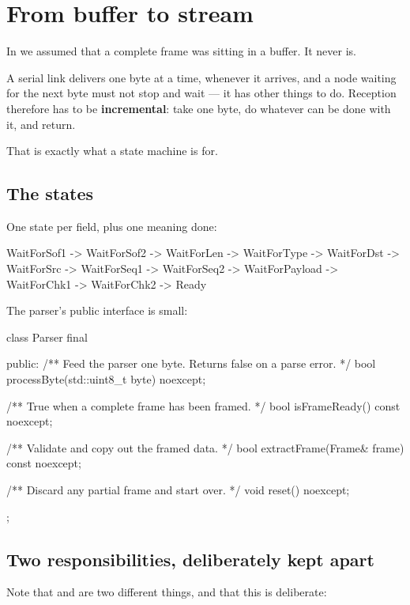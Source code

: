 \section{From buffer to stream}
\label{sec:frombuffer}

In  we assumed that a complete frame was sitting in a buffer. It never is.

A serial link delivers one byte at a time, whenever it arrives, and a node waiting for the next
byte must not stop and wait --- it has other things to do. Reception therefore has to be
\textbf{incremental}: take one byte, do whatever can be done with it, and return.

That is exactly what a state machine is for.

\subsection{The states}

One state per field, plus one meaning done:

\begin{console}
WaitForSof1 -> WaitForSof2 -> WaitForLen  -> WaitForType -> WaitForDst
            -> WaitForSrc  -> WaitForSeq1 -> WaitForSeq2 -> WaitForPayload
            -> WaitForChk1 -> WaitForChk2 -> Ready
\end{console}

The parser's public interface is small:

\begin{cppcode}
class Parser final
{
public:
    /** Feed the parser one byte. Returns false on a parse error. */
    bool processByte(std::uint8_t byte) noexcept;

    /** True when a complete frame has been framed. */
    bool isFrameReady() const noexcept;

    /** Validate and copy out the framed data. */
    bool extractFrame(Frame& frame) const noexcept;

    /** Discard any partial frame and start over. */
    void reset() noexcept;
};
\end{cppcode}

\subsection{Two responsibilities, deliberately kept apart}

Note that  and  are two different things, and that this
is deliberate:

